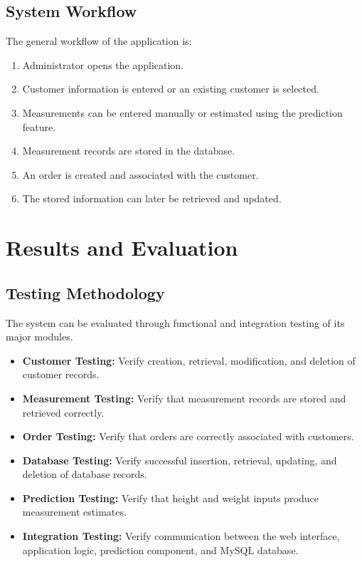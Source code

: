 \documentclass[12pt,a4paper]{report}
\begin{document}
\section{System Workflow}

The general workflow of the application is:

\begin{enumerate}
  \item Administrator opens the application.
  \item Customer information is entered or an existing customer is selected.
  \item Measurements can be entered manually or estimated using the
        prediction feature.
  \item Measurement records are stored in the database.
  \item An order is created and associated with the customer.
  \item The stored information can later be retrieved and updated.
\end{enumerate}


\chapter{Results and Evaluation}

\section{Testing Methodology}

The system can be evaluated through functional and integration testing of its
major modules.

\begin{itemize}
  \item \textbf{Customer Testing:} Verify creation, retrieval, modification,
        and deletion of customer records.
  \item \textbf{Measurement Testing:} Verify that measurement records are
        stored and retrieved correctly.
  \item \textbf{Order Testing:} Verify that orders are correctly associated
        with customers.
  \item \textbf{Database Testing:} Verify successful insertion, retrieval,
        updating, and deletion of database records.
  \item \textbf{Prediction Testing:} Verify that height and weight inputs
        produce measurement estimates.
  \item \textbf{Integration Testing:} Verify communication between the
        web interface, application logic, prediction component, and
        MySQL database.
\end{itemize}
\end{document}
